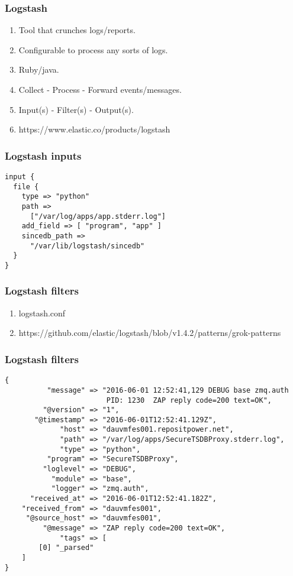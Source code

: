 \documentclass[13pt, ignorenonframetext]{beamer}
\begin{document}
\begin{frame}
\frametitle{Logstash}
\begin{enumerate}
    \item Tool that crunches logs/reports.
    \item Configurable to process any sorts of logs.
    \item Ruby/java.
    \item Collect - Process - Forward events/messages.
    \item Input(s) - Filter(s) - Output(s).
    \item https://www.elastic.co/products/logstash
\end{enumerate}
\end{frame}


\begin{frame}[fragile]
\frametitle{Logstash inputs}
\begin{lstlisting}[basicstyle=\footnotesize]
input {
  file {
    type => "python"
    path => 
      ["/var/log/apps/app.stderr.log"]
    add_field => [ "program", "app" ]
    sincedb_path => 
      "/var/lib/logstash/sincedb"
  }
}
\end{lstlisting}
\end{frame}


\begin{frame}
\frametitle{Logstash filters}
\begin{enumerate}
\item logstash.conf
\item https://github.com/elastic/logstash/blob/v1.4.2/patterns/grok-patterns
\end{enumerate}
\end{frame}


\begin{frame}[fragile]
\frametitle{Logstash filters}
\begin{lstlisting}[basicstyle=\scriptsize]
{
          "message" => "2016-06-01 12:52:41,129 DEBUG base zmq.auth 
                        PID: 1230  ZAP reply code=200 text=OK",
         "@version" => "1",
       "@timestamp" => "2016-06-01T12:52:41.129Z",
             "host" => "dauvmfes001.repositpower.net",
             "path" => "/var/log/apps/SecureTSDBProxy.stderr.log",
             "type" => "python", 
          "program" => "SecureTSDBProxy",
         "loglevel" => "DEBUG",
           "module" => "base",
           "logger" => "zmq.auth",  
      "received_at" => "2016-06-01T12:52:41.182Z",
    "received_from" => "dauvmfes001",
     "@source_host" => "dauvmfes001",
         "@message" => "ZAP reply code=200 text=OK",
             "tags" => [
        [0] "_parsed"
    ]
}
\end{lstlisting}
\end{frame}
\end{document}
